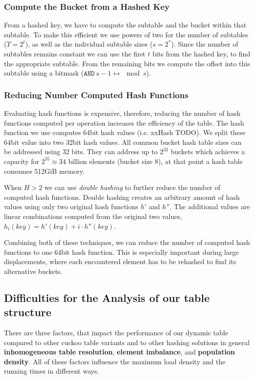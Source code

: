\documentclass[a4paper,UKenglish]{lipics-v2016}
\begin{document}
\subsubsection*{Compute the Bucket from a Hashed Key}
From a hashed key, we have to compute the subtable and the bucket
within that subtable.  To make this efficient we use powers of two for
the number of subtables ($T = 2^t$), as well as the individual
subtable sizes ($s = 2^*$).  Since the number of subtables remains
constant we can use the first $t$ bits from the hashed key, to find the
appropriate subtable.  From the remaining bits we compute the offset
into this subtable using a bitmask ($\texttt{AND}~s-1 \leftrightarrow
\mod s$).

\subsubsection*{Reducing Number Computed Hash Functions}
Evaluating hash functions is expensive, therefore, reducing the number
of hash functions computed per operation increases the efficiency of
the table.  The hash function we use computes 64bit hash values
(i.e. xxHash TODO).  We split these 64bit value into two 32bit hash
values. All common bucket hash table sizes can be addressed using 32
bits. They can address up to $2^{32}$ buckets which achieves a
capacity for \(2^{35} \approx 34\) billion elements (bucket size 8),
at that point a hash table consumes 512GiB memory.

When $H > 2$ we can use \emph{double hashing} to further reduce the number
of computed hash functions. Double hashing creates an arbitrary amount
of hash values using only two original hash functions $h'$ and
$h''$.  The additional values are linear combinations computed
from the original two values, $h_i(key) = h'(key) + i\cdot
h''(key)$.

Combining both of these techniques, we can reduce the number of
computed hash functions to one 64bit hash function.  This is
especially important during large displacements, where each
encountered element has to be rehashed to find its alternative
buckets.

\subsection{Difficulties for the Analysis of our table structure}
There are three factors, that impact the performance of our dynamic
table compared to other cuckoo table variants and to other hashing solutions in
general \textbf{inhomogeneous table resolution}, \textbf{element imbalance}, and
\textbf{population density}. All of these factors influence the maximum load
density and the running times in different ways.
\end{document}
